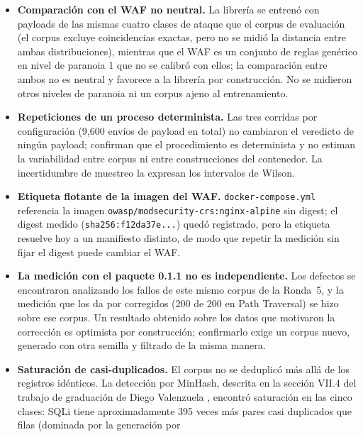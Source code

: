\begin{itemize}
    no codificados (88.4~\%, 84 de 95), una diferencia de 12.2 puntos porcentuales (prueba exacta de
    Fisher bilateral, $p = 0.028$) que no se atribuye a la codificación como causa, porque los dos
    subconjuntos no están controlados por otras características del payload.
        \item \textbf{Comparación con el WAF no neutral.} La librería se entrenó con payloads de las
    mismas cuatro clases de ataque que el corpus de evaluación (el corpus excluye coincidencias
    exactas, pero no se midió la distancia entre ambas distribuciones), mientras que el WAF es un
    conjunto de reglas genérico en nivel de paranoia 1 que no se calibró con ellos; la comparación
    entre ambos no es neutral y favorece a la librería por construcción. No se midieron otros niveles de paranoia ni
    un corpus ajeno al entrenamiento.
    \item \textbf{Repeticiones de un proceso determinista.} Las tres corridas por configuración
    (9{,}600 envíos de payload en total) no cambiaron el veredicto de ningún payload; confirman que
    el procedimiento es determinista y no estiman la variabilidad entre corpus ni entre
    construcciones del contenedor. La incertidumbre de muestreo la expresan los intervalos de
    Wilson.
    \item \textbf{Etiqueta flotante de la imagen del WAF.} \texttt{docker-compose.yml} referencia la
    imagen \texttt{owasp/modsecurity-crs:nginx-alpine} sin digest; el digest medido
    (\texttt{sha256:f12da37e...}) quedó registrado, pero la etiqueta resuelve hoy a un manifiesto
    distinto, de modo que repetir la medición sin fijar el digest puede cambiar el WAF.
    \item \textbf{La medición con el paquete 0.1.1 no es independiente.} Los defectos se
    encontraron analizando los fallos de este mismo corpus de la Ronda~5, y la medición que los da
    por corregidos (200 de 200 en Path Traversal) se hizo sobre ese corpus. Un resultado obtenido
    sobre los datos que motivaron la corrección es optimista por construcción; confirmarlo exige un
    corpus nuevo, generado con otra semilla y filtrado de la misma manera.
    \item \textbf{Saturación de casi-duplicados.} El corpus no se deduplicó más allá de los
    registros idénticos. La detección por MinHash, descrita en la sección VII.4 del trabajo de
    graduación de Diego Valenzuela \cite{valenzuela2026ia}, encontró saturación en las cinco clases: SQLi tiene
    aproximadamente 395 veces más pares casi duplicados que filas (dominada por la generación por

\end{itemize}
